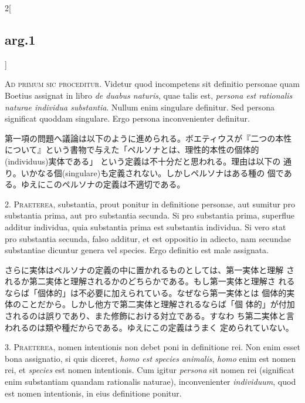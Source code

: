 \documentclass[paper=a4paper,fontsize=10pt,jafontsize=9pt,titlepage]{jlreq}
\begin{document}
\begin{paracol}{2}[\subsection{arg.1}]

{\Huge A}{\scshape d primum sic proceditur}. Videtur quod incompetens sit definitio
personae quam Boetius assignat in libro {\itshape de duabus naturis}, quae talis
est, {\itshape persona est rationalis naturae individua substantia}. Nullum enim
singulare definitur. Sed persona significat quoddam singulare. Ergo
persona inconvenienter definitur.

\switchcolumn

第一項の問題へ議論は以下のように進められる。ボエティウスが『二つの本性
 について』という書物で与えた「ペルソナとは、理性的本性の個体的(individuus)実体である」
 という定義は不十分だと思われる。理由は以下の
 通り。いかなる個(singulare)も定義されない。しかしペルソナはある種の
 個である。ゆえにこのペルソナの定義は不適切である。


2. {\scshape Praeterea}, substantia, prout ponitur in definitione personae, aut
sumitur pro substantia prima, aut pro substantia secunda. Si pro
substantia prima, superflue additur individua, quia substantia prima est
substantia individua. Si vero stat pro substantia secunda, falso
additur, et est oppositio in adiecto, nam secundae substantiae dicuntur
genera vel species. Ergo definitio est male assignata.

\switchcolumn

さらに実体はペルソナの定義の中に置かれるものとしては、第一実体と理解
 されるか第二実体と理解されるかのどちらかである。もし第一実体と理解さ
 れるならば「個体的」は不必要に加えられている。なぜなら第一実体とは
 個体的実体のことだから。しかし他方で第二実体と理解されるならば「個
 体的」が付加されるのは誤りであり、また修飾における対立である。すなわ
 ち第二実体と言われるのは類や種だからである。ゆえにこの定義はうまく
 定められていない。


3. {\scshape Praeterea}, nomen intentionis non debet poni in definitione rei. Non enim
esset bona assignatio, si quis diceret, {\itshape homo est species animalis}, {\itshape homo}
enim est nomen rei, et {\itshape species} est nomen intentionis. Cum igitur {\itshape persona}
sit nomen rei (significat enim substantiam quandam rationalis naturae),
inconvenienter {\itshape individuum}, quod est nomen intentionis, in eius
definitione ponitur.


\end{paracol}
\end{document}
